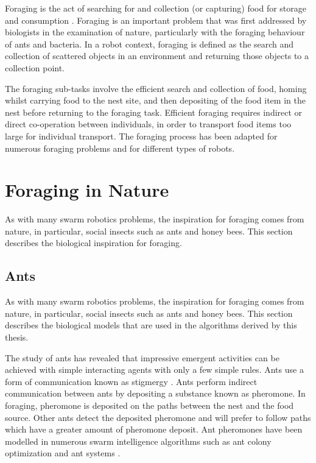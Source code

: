 Foraging is the act of searching for and collection (or capturing) food for storage and consumption \cite{winfield2009foraging}. Foraging is an important problem that was first addressed by biologists in the examination of nature, particularly with the foraging behaviour of ants and bacteria. In a robot context, foraging is defined as the search and collection of scattered objects in an environment and returning those objects to a collection point.

The foraging sub-tasks involve the efficient search and collection of food, homing whilst carrying food to the nest site, and then depositing of the food item in the nest before returning to the foraging task. Efficient foraging requires indirect or direct co-operation between individuals, in order to transport food items too large for individual transport. The foraging process has been adapted for numerous foraging problems and for different types of robots.


\section{Foraging in Nature}
\label{foraginginnature}
As with many swarm robotics problems, the inspiration for foraging comes from nature, in particular, social insects such as ants and honey bees. This section describes the biological inspiration for foraging.


\subsection{Ants}
\label{sec:second:biological}
As with many swarm robotics problems, the inspiration for foraging comes from nature, in particular, social insects such as ants and honey bees. This section describes the biological models that are used in the algorithms derived by this thesis. 

The study of ants has revealed that impressive emergent activities can be achieved with simple interacting agents with only a few simple rules. Ants use a form of communication known as stigmergy \cite{dorigo2000ant}. Ants perform indirect communication between ants by depositing a substance known as pheromone. In foraging, pheromone is deposited on the paths between the nest and the food source. Other ants detect the deposited pheromone and will prefer to follow paths which have a greater amount of pheromone deposit. Ant pheromones have been modelled in numerous swarm intelligence algorithms such as ant colony optimization and ant systems \cite{dorigo2006ant, dorigo2010ant}. 
 
